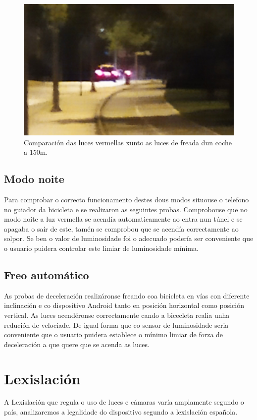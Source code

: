\begin{figure}[tbp]
  \centering
  \includegraphics[scale=0.8]{imaxes/foto-coche.png}
  \caption{Comparación das luces vermellas xunto as luces de freada dun coche a 150m.}
  \label{fig:foto_coche}
\end{figure}

\subsection{Modo noite}
Para comprobar o correcto funcionamento destes dous modos situouse o telefono no guiador da bicicleta e se realizaron as seguintes probas.
Comprobouse que no modo noite a luz vermella se acendía automaticamente ao entra nun túnel e se apagaba o saír de este, tamén se comprobou que se acendía correctamente ao solpor. Se ben o valor de luminosidade foi o adecuado podería ser conveniente que o usuario puidera controlar este limiar de luminosidade mínima.

\subsection{Freo automático}
As probas de deceleración realizáronse freando coa bicicleta en vías con diferente inclinación e co dispositivo Android tanto en posición horizontal como posición vertical. As luces acendéronse correctamente cando a bicecleta realia unha redución de velociade. De igual forma que co sensor de luminosidade seria conveniente que o usuario puidera establece o mínimo limiar de forza de deceleración a que quere que se acenda as luces.


\section{Lexislación}
A Lexislación que regula o uso de luces e cámaras varía amplamente segundo o país, analizaremos a legalidade do dispositivo segundo a lexislación española.

